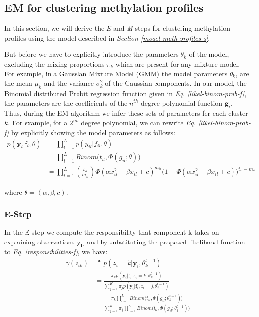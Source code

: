 \subsection{EM for clustering methylation profiles}
In this section, we will derive the \emph{E} and \emph{M} steps for clustering methylation profiles using the model described in \emph{Section \ref{model-meth-profiles-s}}.

But before we have to explicitly introduce the parameters $\theta_{k}$ of the model, excluding the mixing proportions $\pi_{k}$ which are present for any mixture model. For example, in a Gaussian Mixture Model (GMM) the model parameters $\theta_{k}$, are the mean $\mu_{k}$ and the variance $\sigma_{k}^{2}$ of the Gaussian components. In our model, the Binomial distributed Probit regression function given in \emph{Eq. \ref{likel-binom-prob-f}}, the parameters are the coefficients of the $n^{th}$ degree polynomial function $\mathbf{g}_{i}$. Thus, during the EM algorithm we infer these sets of parameters for each cluster $k$. For example, for a $2^{nd}$ degree polynomial, we can rewrite \emph{Eq. \ref{likel-binom-prob-f}} by explicitly showing the model parameters as follows:
\begin{equation} \label{likel-binom-prob-example1-f}
  \begin{split}
	p(\mathbf{y}_{i}|\mathbf{f}_{i}, \theta) & = \prod_{l=1}^{L} p(y_{il}|f_{il}, \theta) \\
							 & = \prod_{l=1}^{L} Binom \big(t_{il}, \Phi(g_{il}; \theta)\big) \\
							 & = \prod_{l=1}^{L} \binom{t_{il}}{m_{il}} \Phi(\alpha x_{il}^{2} + \beta x_{il} + c)^{m_{il}} (1 - \Phi(\alpha x_{il}^{2} + \beta x_{il} + c)\big)^{t_{il} - m_{il}}
  \end{split}
\end{equation}

where $\theta = (\alpha, \beta, c)$.

\subsubsection{E-Step}
In the E-step we compute the responsibility that component k takes on explaining observations $\mathbf{y_{i}}$, and by substituting the proposed likelihood function to \emph{Eq. \ref{responsibilities-f}}, we have:
\begin{equation} \label{responsibilities-model-f}
  \begin{split}
	\gamma(z_{ik}) & \triangleq p(z_{i}=k|\mathbf{y_{i}},\theta_{k}^{t-1}) \\
				   & = \frac{\pi_{k}p(\mathbf{y}_{i}|\mathbf{f}_{i},z_{i}=k,\theta_{k}^{t-1})}{\sum\limits_{j=1}^{K} \pi_{j}p(\mathbf{y}_{i}|\mathbf{f}_{i},z_{i}=j,\theta_{j}^{t-1})} \\
				   & = \frac{\pi_{k} \prod\limits_{l=1}^{L} Binom \big(t_{il}, \Phi(g_{il}; \theta_{k}^{t-1})\big)} {\sum\limits_{j=1}^{K} \pi_{j} \prod\limits_{l=1}^{L} Binom \big(t_{il}, \Phi(g_{il}; \theta_{j}^{t-1})\big)}
  \end{split}
\end{equation}

